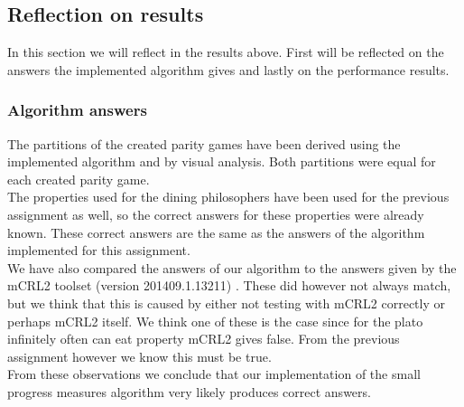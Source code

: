 \documentclass[10pt,a4paper]{article}
\begin{document}
\subsection{Reflection on results}
In this section we will reflect in the results above. First will be reflected on the answers the implemented algorithm gives and lastly on the performance results.

\subsubsection{Algorithm answers}
The partitions of the created parity games have been derived using the implemented algorithm and by visual analysis. Both partitions were equal for each created parity game.\\
The properties used for the dining philosophers have been used for the previous assignment as well, so the correct answers for these properties were already known. These correct answers are the same as the answers of the algorithm implemented for this assignment.\\
We have also compared the answers of our algorithm to the answers given by the mCRL2 toolset (version 201409.1.13211) \cite{mcrl2}. These did however not always match, but we think that this is caused by either not testing with mCRL2 correctly or perhaps mCRL2 itself. We think one of these is the case since for the plato infinitely often can eat property mCRL2 gives false. From the previous assignment however we know this must be true.\\
From these observations we conclude that our implementation of the small progress measures algorithm very likely produces correct answers.
\end{document}
